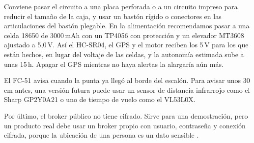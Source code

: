 \documentclass[conference,a4paper]{IEEEtran}
\begin{document}
Conviene pasar el circuito a una placa perforada o a un circuito impreso para reducir el tamaño de la caja, y usar un bastón rígido o conectores en las articulaciones del bastón plegable. En la alimentación recomendamos pasar a una celda 18650 de 3000\,mAh con un TP4056 con protección y un elevador MT3608 ajustado a 5,0\,V. Así el HC-SR04, el GPS y el motor reciben los 5\,V para los que están hechos, en lugar del voltaje de las celdas, y la autonomía estimada sube a unas 15\,h. Apagar el GPS mientras no haya alertas la alargaría aún más.

El FC-51 avisa cuando la punta ya llegó al borde del escalón. Para avisar unos 30\,cm antes, una versión futura puede usar un sensor de distancia infrarrojo como el Sharp GP2Y0A21 o uno de tiempo de vuelo como el VL53L0X.

Por último, el broker público no tiene cifrado. Sirve para una demostración, pero un producto real debe usar un broker propio con usuario, contraseña y conexión cifrada, porque la ubicación de una persona es un dato sensible \cite{tsantikidou}.
\end{document}
